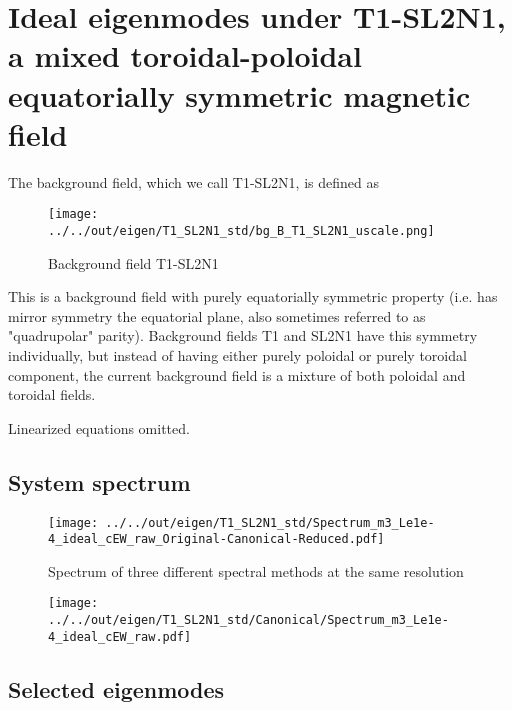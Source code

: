\section{Ideal eigenmodes under T1-SL2N1, a mixed toroidal-poloidal equatorially symmetric magnetic field}

The background field, which we call T1-SL2N1, is defined as

\begin{figure}[h]
    \centering
    \texttt{[image: ../../out/eigen/T1\_SL2N1\_std/bg\_B\_T1\_SL2N1\_uscale.png]}
    \caption{Background field T1-SL2N1}
\end{figure}

This is a background field with purely equatorially symmetric property (i.e. has mirror symmetry \wrt the equatorial plane, also sometimes referred to as "quadrupolar" parity). Background fields T1 and SL2N1 have this symmetry individually, but instead of having either purely poloidal or purely toroidal component, the current background field is a mixture of both poloidal and toroidal fields.

Linearized equations omitted.

\subsection{System spectrum}

\begin{figure}[h]
    \centering
    \texttt{[image: ../../out/eigen/T1\_SL2N1\_std/Spectrum\_m3\_Le1e-4\_ideal\_cEW\_raw\_Original-Canonical-Reduced.pdf]}
    \caption{Spectrum of three different spectral methods at the same resolution}
\end{figure}

\begin{figure}[h]
    \centering
    \texttt{[image: ../../out/eigen/T1\_SL2N1\_std/Canonical/Spectrum\_m3\_Le1e-4\_ideal\_cEW\_raw.pdf]}
\end{figure}


\subsection{Selected eigenmodes}


\clearpage

